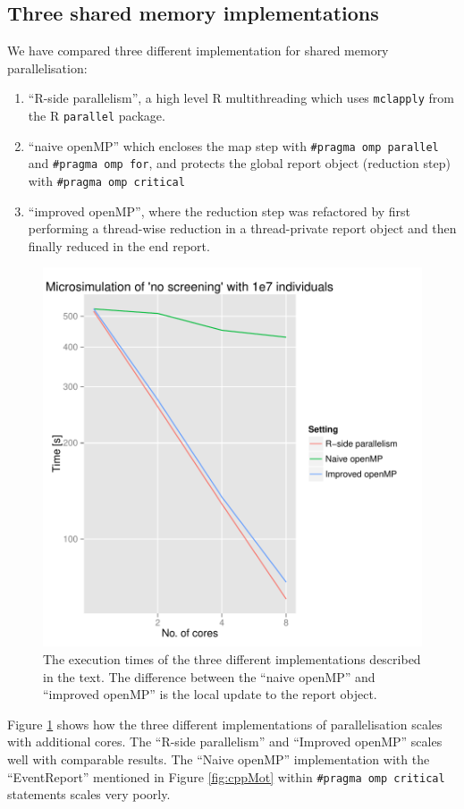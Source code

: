 \subsection{Three shared memory implementations}

We have compared three different implementation for shared memory parallelisation: 
\begin{enumerate}
\item ``R-side parallelism'', a high level R multithreading which uses
  \texttt{mclapply} from the R \texttt{parallel} package.
\item ``naive openMP'' which encloses the map step with \texttt{\#pragma
    omp parallel} and \texttt{\#pragma omp for}, and protects the
  global report object (reduction step) with \texttt{\#pragma omp
    critical}
\item ``improved openMP'', where the reduction step was refactored by
  first performing a thread-wise reduction in a thread-private report
  object and then finally reduced in the end report.
\end{enumerate}
\begin{figure}[!htbp] \centering
  \includegraphics[height=0.5\textheight]{images/implementationProfiling.pdf}
  \caption{The execution times of the three different implementations
    described in the text. The difference between the ``naive openMP''
  and ``improved openMP'' is the local update to the report
  object.}
  \label{fig:implScaling}
\end{figure} 
Figure \ref{fig:implScaling} shows how the three
different implementations of parallelisation scales with additional
cores. The ``R-side parallelism'' and ``Improved openMP'' scales
well with comparable results. The ``Naive openMP'' implementation
with the ``EventReport'' mentioned in Figure \ref{fig:cppMot} within
\texttt{\#pragma omp critical} statements scales very poorly. 

